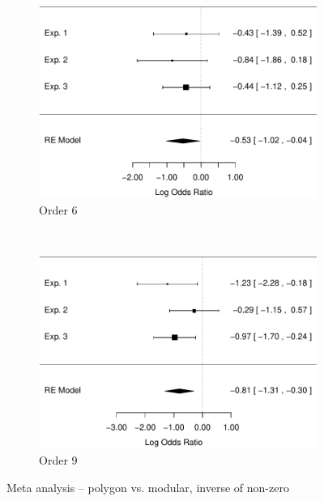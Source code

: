 \documentclass[man,10pt]{apa6}
\begin{document}
\begin{figure}
\centering
\begin{subfigure}[c]{0.4\textwidth}
\centering
\includegraphics[width=\textwidth]{figures/meta/question_typeinverse_nonzero_6_conditionpolygon.pdf}
\caption{Order 6}
\end{subfigure}
~
\begin{subfigure}[c]{0.4\textwidth}
\centering
\includegraphics[width=\textwidth]{figures/meta/question_typeinverse_nonzero_9_conditionpolygon.pdf}
\caption{Order 9}
\end{subfigure}
\caption{Meta analysis -- polygon vs. modular, inverse of non-zero}
\label{meta_inNZ_p}
\end{figure}\noindent 
\end{document}
